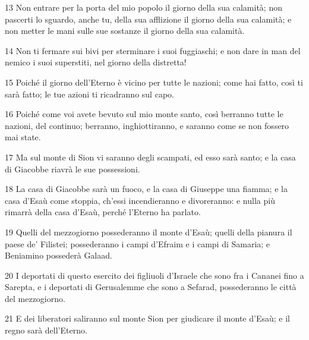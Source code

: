 \par 13 Non entrare per la porta del mio popolo il giorno della sua calamità; non pascerti lo sguardo, anche tu, della sua afflizione il giorno della sua calamità; e non metter le mani sulle sue sostanze il giorno della sua calamità.
\par 14 Non ti fermare sui bivi per sterminare i suoi fuggiaschi; e non dare in man del nemico i suoi superstiti, nel giorno della distretta!
\par 15 Poiché il giorno dell'Eterno è vicino per tutte le nazioni; come hai fatto, così ti sarà fatto; le tue azioni ti ricadranno sul capo.
\par 16 Poiché come voi avete bevuto sul mio monte santo, così berranno tutte le nazioni, del continuo; berranno, inghiottiranno, e saranno come se non fossero mai state.
\par 17 Ma sul monte di Sion vi saranno degli scampati, ed esso sarà santo; e la casa di Giacobbe riavrà le sue possessioni.
\par 18 La casa di Giacobbe sarà un fuoco, e la casa di Giuseppe una fiamma; e la casa d'Esaù come stoppia, ch'essi incendieranno e divoreranno: e nulla più rimarrà della casa d'Esaù, perché l'Eterno ha parlato.
\par 19 Quelli del mezzogiorno possederanno il monte d'Esaù; quelli della pianura il paese de' Filistei; possederanno i campi d'Efraim e i campi di Samaria; e Beniamino possederà Galaad.
\par 20 I deportati di questo esercito dei figliuoli d'Israele che sono fra i Cananei fino a Sarepta, e i deportati di Gerusalemme che sono a Sefarad, possederanno le città del mezzogiorno.
\par 21 E dei liberatori saliranno sul monte Sion per giudicare il monte d'Esaù; e il regno sarà dell'Eterno.


